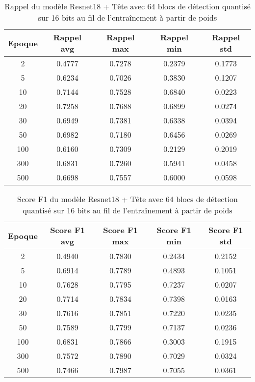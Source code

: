 \begin{table}[!ht]
    \caption{Rappel du modèle Resnet18 + Tête avec 64 blocs de détection quantisé sur 16 bits au fil de l'entraînement à partir de poids}
    \label{tab:qresnet18+head_64n_rappel_16b_from_weights}
    \centering
    \begin{tabular}{ |c||c|c|c|c|  }
        \hline
        \rowcolor{gray!50}
        Epoque & Rappel avg & Rappel max & Rappel min & Rappel std\\
        \hline
        2 & 0.4777 & 0.7278 & 0.2379 & 0.1773\\
        5 & 0.6234 & 0.7026 & 0.3830 & 0.1207\\
        10 & 0.7144 & 0.7528 & 0.6840 & 0.0223\\
        20 & 0.7258 & 0.7688 & 0.6899 & 0.0274\\
        30 & 0.6949 & 0.7381 & 0.6338 & 0.0394\\
        50 & 0.6982 & 0.7180 & 0.6456 & 0.0269\\
        100 & 0.6160 & 0.7309 & 0.2129 & 0.2019\\
        300 & 0.6831 & 0.7260 & 0.5941 & 0.0458\\
        500 & 0.6698 & 0.7557 & 0.6000 & 0.0598\\
        \hline
    \end{tabular}
\end{table}

\begin{table}[!ht]
    \caption{Score F1 du modèle Resnet18 + Tête avec 64 blocs de détection quantisé sur 16 bits au fil de l'entraînement à partir de poids}
    \label{tab:qresnet18+head_64n_f1score_16b_from_weights}
    \centering
    \begin{tabular}{ |c||c|c|c|c|  }
        \hline
        \rowcolor{gray!50}
        Epoque & Score F1 avg & Score F1 max & Score F1 min & Score F1 std\\
        \hline
        2 & 0.4940 & 0.7830 & 0.2434 & 0.2152\\
        5 & 0.6914 & 0.7789 & 0.4893 & 0.1051\\
        10 & 0.7628 & 0.7795 & 0.7237 & 0.0207\\
        20 & 0.7714 & 0.7834 & 0.7398 & 0.0163\\
        30 & 0.7616 & 0.7851 & 0.7220 & 0.0235\\
        50 & 0.7589 & 0.7799 & 0.7137 & 0.0236\\
        100 & 0.6831 & 0.7866 & 0.3003 & 0.1915\\
        300 & 0.7572 & 0.7890 & 0.7029 & 0.0324\\
        500 & 0.7466 & 0.7987 & 0.7055 & 0.0361\\
        \hline
    \end{tabular}
\end{table}

